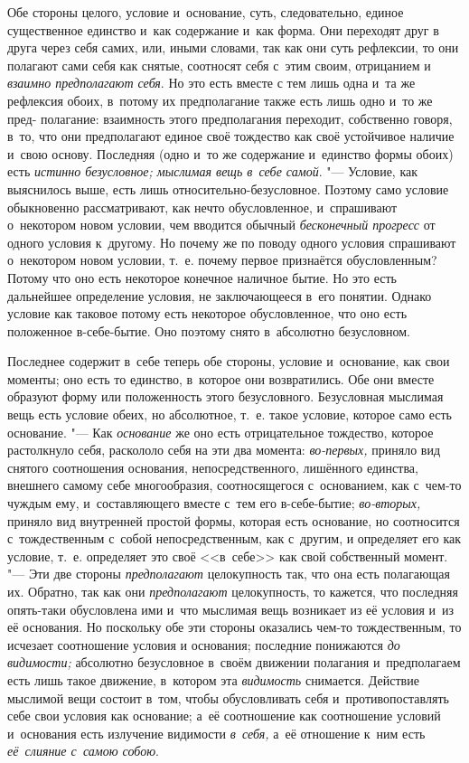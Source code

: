 Обе стороны целого, условие и~основание, суть, следовательно, единое
существенное единство и~как содержание и~как форма. Они переходят друг в
друга через себя самих, или, иными словами, так как они суть рефлексии, то
они полагают сами себя как снятые, соотносят себя с~этим своим, отрицанием
и {\em взаимно предполагают себя}. Но это есть вместе с
тем лишь одна и~та же рефлексия обоих, в~потому их предполагание также есть
лишь одно и~то же пред- полагание: взаимность этого предполагания
переходит, собственно говоря, в~то, что они предполагают единое своё
тождество как своё устойчивое наличие и~свою основу. Последняя (одно и~то
же содержание и~единство формы обоих) есть {\em истинно
безусловное; мыслимая вещь в~себе самой}. "--- Условие, как выяснилось выше,
есть лишь относительно-безусловное. Поэтому само условие обыкновенно
рассматривают, как нечто обусловленное, и~спрашивают о~некотором новом
условии, чем вводится обычный {\em бесконечный
прогресс} от одного условия к~другому. Но почему же по поводу одного
условия спрашивают о~некотором новом условии, т.~е. почему первое
признаётся обусловленным? Потому что оно есть некоторое конечное наличное
бытие. Но это есть дальнейшее определение условия, не заключающееся в~его
понятии. Однако условие как таковое потому есть некоторое обусловленное,
что оно есть положенное в-себе-бытие. Оно поэтому снято в~абсолютно
безусловном.

Последнее содержит в~себе теперь обе стороны, условие и~основание, как свои
моменты; оно есть то единство, в~которое они возвратились. Обе они вместе
образуют форму или положенность этого безусловного. Безусловная мыслимая вещь
есть условие обеих, но абсолютное, т.~е. такое условие, которое само есть
основание. "--- Как {\em основание} же оно есть отрицательное тождество,
которое растолкнуло себя, раскололо себя на эти два момента: {\em во-первых,}
приняло вид снятого соотношения основания, непосредственного, лишённого
единства, внешнего самому себе многообразия, соотносящегося с~основанием, как
с~чем-то чуждым ему, и~составляющего вместе с~тем его в-себе-бытие;
{\em во-вторых,} приняло вид внутренней простой формы, которая есть основание,
но соотносится с~тождественным с~собой непосредственным, как с~другим, и
определяет его как условие, т.~е. определяет это своё <<в~себе>> как свой
собственный момент. "--- Эти две стороны {\em предполагают} целокупность так,
что она есть полагающая их. Обратно, так как они {\em предполагают}
целокупность, то кажется, что последняя опять-таки обусловлена ими и~что
мыслимая вещь возникает из её условия и~из её основания. Но поскольку обе эти
стороны оказались чем-то тождественным, то исчезает соотношение условия и
основания; последние понижаются {\em до видимости;} абсолютно безусловное
в~своём движении полагания и~предполагаем есть лишь такое движение, в~котором
эта {\em видимость} снимается. Действие мыслимой вещи состоит в~том, чтобы
обусловливать себя и~противопоставлять себе свои условия как основание; а~её
соотношение как соотношение условий и~основания есть излучение видимости
{\em в~себя,} а~её отношение к~ним есть {\em её~слияние с~самою собою}.

